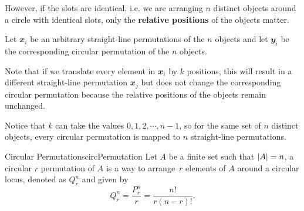 \documentclass[math]{amznotes}
\theoremstyle{remark}
\begin{document}
However, if the slots are identical, i.e. we are arranging $n$ distinct objects around a circle with identical slots, only the \textbf{relative positions} of the objects matter.

Let $\mathbfit{x}_i$ be an arbitrary straight-line permutations of the $n$ objects and let $\mathbfit{y}_i$ be the corresponding circular permutation of the $n$ objects.

Note that if we translate every element in $\mathbfit{x}_i$ by $k$ positions, this will result in a different straight-line permutation $\mathbfit{x}_j$ but does not change the corresponding circular permutation because the relative positions of the objects remain unchanged.

Notice that $k$ can take the values $0, 1, 2, \cdots, n - 1$, so for the same set of $n$ distinct objects, every circular permutation is mapped to $n$ straight-line permutations.
\begin{dfnbox}{Circular Permutations}{circPermutation}
    Let $A$ be a finite set such that ${\left\lvert {A} \right\rvert} = n$, a circular $r$ permutation of $A$ is a way to arrange~$r$ elements of $A$ around a circular locus, denoted as $Q^n_r$ and given by
    \begin{equation*}
        Q^n_r = \frac{P^n_r}{r} = \frac{n!}{r(n - r)!}.
    \end{equation*}
\end{dfnbox}
\end{document}
